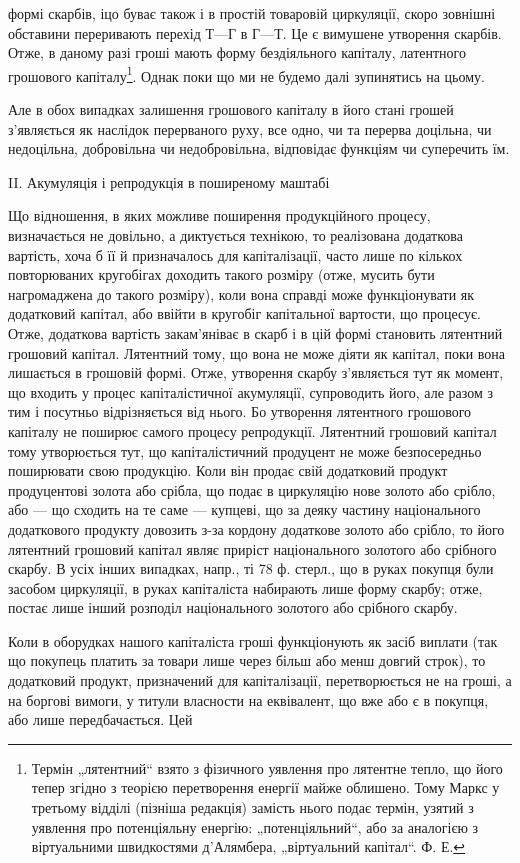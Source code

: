 \parcont{}  %
формі скарбів, іцо буває також і в простій товаровій циркуляції, скоро
зовнішні обставини переривають перехід $Т — Г$ в $Г — Т$. Це є вимушене
утворення скарбів. Отже, в даному разі гроші мають форму бездіяльного
капіталу, латентного грошового капіталу\footnote{
Термін „лятентний“ взято з фізичного уявлення про лятентне тепло, що
його тепер згідно з теорією перетворення енергії майже облишено. Тому Маркс
у третьому відділі (пізніша редакція) замість нього подає термін, узятий з уявлення
про потенціяльну енергію: „потенціяльний“, або за аналогією з віртуальними швидкостями
д’Алямбера, „віртуальний капітал“. Ф. Е.
}. Однак поки що ми не будемо
далі зупинятись на цьому.

Але в обох випадках залишення грошового капіталу в його стані
грошей з’являється як наслідок перерваного руху, все одно, чи та перерва
доцільна, чи недоцільна, добровільна чи недобровільна, відповідає функціям
чи суперечить їм.

II. Акумуляція і репродукція в поширеному маштабі

Що відношення, в яких можливе поширення продукційного процесу,
визначається не довільно, а диктується технікою, то реалізована додаткова
вартість, хоча б її й призначалось для капіталізації, часто лише по
кількох повторюваних кругобігах доходить такого розміру (отже, мусить
бути нагромаджена до такого розміру), коли вона справді може функціонувати
як додатковий капітал, або ввійти в кругобіг капітальної вартости,
що процесує. Отже, додаткова вартість закам’яніває в скарб і в цій
формі становить лятентний грошовий капітал. Лятентний тому, що вона не
може діяти як капітал, поки вона лишається в грошовій формі. Отже,
утворення скарбу з’являється тут як момент, що входить у процес капіталістичної
акумуляції, супроводить його, але разом з тим і посутньо
відрізняється від нього. Бо утворення лятентного грошового капіталу
не поширює самого процесу репродукції. Лятентний грошовий
капітал тому утворюється тут, що капіталістичний продуцент не може
безпосередньо поширювати свою продукцію. Коли він продає свій додатковий
продукт продуцентові золота або срібла, що подає в циркуляцію
нове золото або срібло, або — що сходить на те саме — купцеві, що
за деяку частину національного додаткового продукту довозить
з-за кордону додаткове золото або срібло, то його лятентний грошовий
капітал являє приріст національного золотого або срібного скарбу. В усіх
інших випадках, напр., ті 78 ф. стерл., що в руках покупця були засобом
циркуляції, в руках капіталіста набирають лише форму скарбу;
отже, постає лише інший розподіл національного золотого або срібного
скарбу.

Коли в оборудках нашого капіталіста гроші функціонують як засіб виплати
(так що покупець платить за товари лише через більш або менш довгий
строк), то додатковий продукт, призначений для капіталізації, перетворюється
не на гроші, а на боргові вимоги, у титули власности
на еквівалент, що вже або є в покупця, або лише передбачається. Цей
\parbreak{}  %
